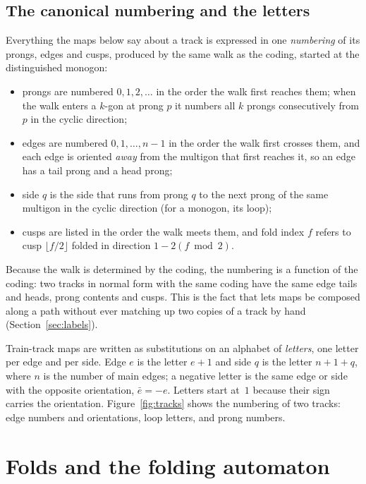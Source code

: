 \documentclass[12pt]{amsart}
\newcommand{\anti}[1]{\bar{#1}}          %
\theoremstyle{plain}
\theoremstyle{definition}
\begin{document}
\subsection{The canonical numbering and the letters}
\label{sec:numbering}
Everything the maps below say about a track is expressed in one
\emph{numbering} of its prongs, edges and cusps, produced by the same
walk as the coding, started at the distinguished monogon:
\begin{itemize}
  \item prongs are numbered $0,1,2,\dots$ in the order the walk first
    reaches them; when the walk enters a $k$-gon at prong $p$ it numbers
    all $k$ prongs consecutively from $p$ in the cyclic direction;
  \item edges are numbered $0,1,\dots,n-1$ in the order the walk first
    crosses them, and each edge is oriented \emph{away} from the multigon
    that first reaches it, so an edge has a tail prong and a head prong;
  \item side $q$ is the side that runs from prong $q$ to the next prong
    of the same multigon in the cyclic direction (for a monogon, its loop);
  \item cusps are listed in the order the walk meets them, and fold index
    $f$ refers to cusp $\lfloor f/2\rfloor$ folded in direction
    $1-2(f\bmod 2)$.
\end{itemize}
Because the walk is determined by the coding, the numbering is a function
of the coding: two tracks in normal form with the same coding have the
same edge tails and heads, prong contents and cusps.  This is the fact
that lets maps be composed along a path without ever matching up two
copies of a track by hand (Section~\ref{sec:labels}).

Train-track maps are written as substitutions on an alphabet of
\emph{letters}, one letter per edge and per side.  Edge $e$ is the
letter $e+1$ and side $q$ is the letter $n+1+q$, where $n$ is the number
of main edges; a negative letter is the same edge or side with the
opposite orientation, $\anti e=-e$.  Letters start at~$1$ because their
sign carries the orientation.  Figure~\ref{fig:tracks} shows the
numbering of two tracks: edge numbers and orientations, loop letters,
and prong numbers.


\section{Folds and the folding automaton}
\label{sec:folds}
\end{document}
